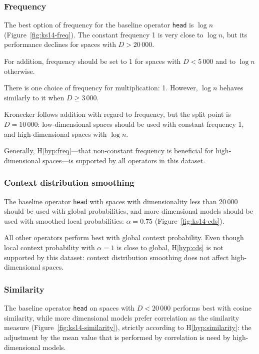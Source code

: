 

\subsubsection{Frequency}
The best option of frequency for the baseline operator \texttt{head} is $\log n$ (Figure~\ref{fig:ks14-freq}). The constant frequency 1 is very close to $\log n$, but its performance declines for spaces with $D > 20\,000$.

For addition, frequency should be set to 1 for spaces with $D < 5\,000$ and to $\log n$ otherwise.

There is one choice of frequency for multiplication: 1. However, $\log n$ behaves similarly to it when $D \geq 3\,000$.

Kronecker follows addition with regard to frequency, but the split point is $D = 10\,000$: low-dimensional spaces should be used with constant frequency 1, and high-dimensional spaces with $\log n$.

Generally, H\ref{hyp:freq}---that non-constant frequency is beneficial for high-dimensional spaces---is supported by all operators in this dataset.

\subsubsection{Context distribution smoothing}


The baseline operator \texttt{head} with spaces with dimensionality less than 20\,000 should be used with global probabilities, and more dimensional models should be used with smoothed local probabilities: $\alpha = 0.75$ (Figure~\ref{fig:ks14-cds}).

All other operators perform best with global context probability. Even though local context probability with $\alpha = 1$ is close to global, H\ref{hyp:cds} is not supported by this dataset: context distribution smoothing does not affect high-dimensional spaces.

\subsubsection{Similarity}
The baseline operator \texttt{head} on spaces with $D < 20\,000$ performs best with cosine similarity, while more dimensional models prefer correlation as the similarity measure (Figure~\ref{fig:ks14-similarity}), strictly according to H\ref{hyp:similarity}: the adjustment by the mean value that is performed by correlation is need by high-dimensional models.

